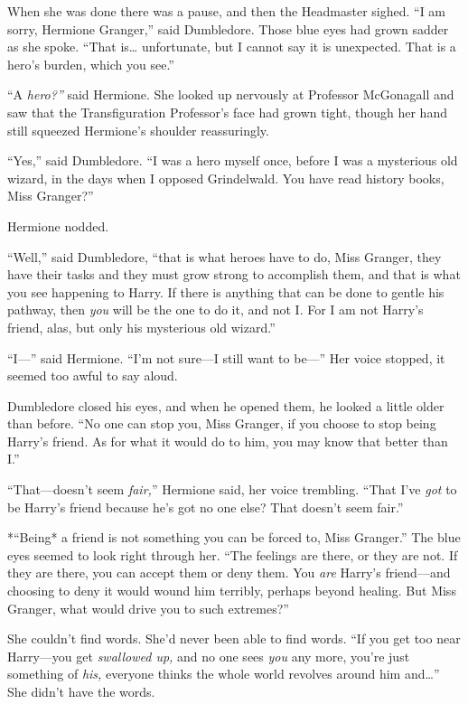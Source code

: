 When she was done there was a pause, and then the Headmaster sighed. ``I
am sorry, Hermione Granger,'' said Dumbledore. Those blue eyes had grown
sadder as she spoke. ``That is\ldots{} unfortunate, but I cannot say it
is unexpected. That is a hero's burden, which you see.''

``A \emph{hero?''} said Hermione. She looked up nervously at Professor
McGonagall and saw that the Transfiguration Professor's face had grown
tight, though her hand still squeezed Hermione's shoulder reassuringly.

``Yes,'' said Dumbledore. ``I was a hero myself once, before I was a
mysterious old wizard, in the days when I opposed Grindelwald. You have
read history books, Miss Granger?''

Hermione nodded.

``Well,'' said Dumbledore, ``that is what heroes have to do, Miss
Granger, they have their tasks and they must grow strong to accomplish
them, and that is what you see happening to Harry. If there is anything
that can be done to gentle his pathway, then \emph{you} will be the one
to do it, and not I. For I am not Harry's friend, alas, but only his
mysterious old wizard.''

``I---'' said Hermione. ``I'm not sure---I still want to be---'' Her
voice stopped, it seemed too awful to say aloud.

Dumbledore closed his eyes, and when he opened them, he looked a little
older than before. ``No one can stop you, Miss Granger, if you choose to
stop being Harry's friend. As for what it would do to him, you may know
that better than I.''

``That---doesn't seem \emph{fair,}'' Hermione said, her voice trembling.
``That I've \emph{got} to be Harry's friend because he's got no one
else? That doesn't seem fair.''

*``Being* a friend is not something you can be forced to, Miss
Granger.'' The blue eyes seemed to look right through her. ``The
feelings are there, or they are not. If they are there, you can accept
them or deny them. You \emph{are} Harry's friend---and choosing to deny
it would wound him terribly, perhaps beyond healing. But Miss Granger,
what would drive you to such extremes?''

She couldn't find words. She'd never been able to find words. ``If you
get too near Harry---you get \emph{swallowed up,} and no one sees
\emph{you} any more, you're just something of \emph{his,} everyone
thinks the whole world revolves around him and\ldots{}'' She didn't have
the words.

